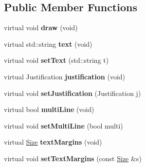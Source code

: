 \subsection*{Public Member Functions}
\begin{DoxyCompactItemize}
\item 
virtual void {\bfseries draw} (void)\hypertarget{classStaticDisplay_aa58cbeececf727581e445acf71c3edaf}{}\label{classStaticDisplay_aa58cbeececf727581e445acf71c3edaf}

\item 
virtual std\+::string {\bfseries text} (void)\hypertarget{classStaticDisplay_ac5a3e8dc9ec9c32c4b775d91eb06d29d}{}\label{classStaticDisplay_ac5a3e8dc9ec9c32c4b775d91eb06d29d}

\item 
virtual void {\bfseries set\+Text} (std\+::string t)\hypertarget{classStaticDisplay_ae06278fa33af88ddce154375e4f279db}{}\label{classStaticDisplay_ae06278fa33af88ddce154375e4f279db}

\item 
virtual Justification {\bfseries justification} (void)\hypertarget{classStaticDisplay_ad1768477b680da12f8722c8982d96df3}{}\label{classStaticDisplay_ad1768477b680da12f8722c8982d96df3}

\item 
virtual void {\bfseries set\+Justification} (Justification j)\hypertarget{classStaticDisplay_a2d42f967a00c8f1d46eb497a66098ac6}{}\label{classStaticDisplay_a2d42f967a00c8f1d46eb497a66098ac6}

\item 
virtual bool {\bfseries multi\+Line} (void)\hypertarget{classStaticDisplay_af972c564fc6711945e9d7195b969f863}{}\label{classStaticDisplay_af972c564fc6711945e9d7195b969f863}

\item 
virtual void {\bfseries set\+Multi\+Line} (bool multi)\hypertarget{classStaticDisplay_a980dce77a6148b120d0840f71371c890}{}\label{classStaticDisplay_a980dce77a6148b120d0840f71371c890}

\item 
virtual \hyperlink{structSize}{Size} {\bfseries text\+Margins} (void)\hypertarget{classStaticDisplay_a02b62158ddce73cfbd13ceab1eb0bb22}{}\label{classStaticDisplay_a02b62158ddce73cfbd13ceab1eb0bb22}

\item 
virtual void {\bfseries set\+Text\+Margins} (const \hyperlink{structSize}{Size} \&s)\hypertarget{classStaticDisplay_a0501a57f2df123b528f08978079bd14d}{}\label{classStaticDisplay_a0501a57f2df123b528f08978079bd14d}


\end{DoxyCompactItemize}
